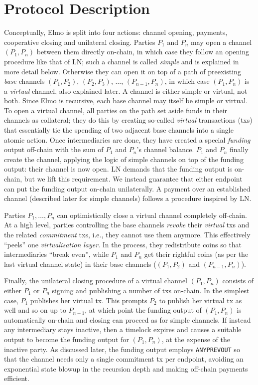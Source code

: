 \section{Protocol Description}
  Conceptually, Elmo is split into four actions: channel opening,
  payments, cooperative closing and unilateral closing. Parties $P_1$ and $P_n$
  may open a channel $(P_1, P_n)$ between them directly on-chain, in which case
  they follow an opening procedure like that of LN; such a channel is called
  \emph{simple} and is explained in more detail below.
  Otherwise they can open it on top of a path
  of preexisting \emph{base} channels $(P_1, P_2)$, $(P_2, P_3)$, $\dots$,
  $(P_{n-1}, P_{n})$, in which case $(P_1, P_n)$ is a \emph{virtual}
  channel, also explained later. A channel is either simple or virtual, not both. Since Elmo is
  recursive, each base channel may itself be simple or
  virtual. To open a virtual
  channel, all parties on the
  path set aside funds in their channels as
  collateral; they do this
  by creating so-called \emph{virtual} transactions (txs) that essentially
  tie the spending of two adjacent base channels into a single atomic action.
  Once intermediaries are done, they have created a special \emph{funding}
  output off-chain with the sum of $P_1$ and $P_n$'s channel
  balance. $P_1$ and $P_n$
  finally create the channel, applying the logic of simple channels on top of
  the funding output: their channel is now open. LN demands that the funding
  output is on-chain, but we lift this requirement. We instead guarantee that
  either endpoint can put the funding output on-chain unilaterally.
  A payment over an established channel (described later for simple channels) follows a procedure inspired by
  LN.

  Parties $P_1, \dots, P_n$ can optimistically close a virtual channel
  completely off-chain. At a high
  level, parties controlling the base channels \emph{revoke} their \emph{virtual}
  txs and the related \emph{commitment} txs, i.e., they cannot use them
  anymore. This effectively ``peels'' one \emph{virtualisation layer}.
  In the process, they redistribute coins so that intermediaries ``break even'',
  while $P_1$
  and $P_n$ get their rightful coins (as per the last virtual channel
  state) in their base channels ($(P_1, P_2)$ and $(P_{n-1}, P_n)$).

  Finally, the unilateral closing procedure of a virtual channel $(P_1, P_n)$
  consists of either $P_1$ or $P_n$ signing and publishing a number of
  txs on-chain. In the simplest case, $P_1$ publishes her virtual tx. This
  prompts $P_2$ to publish her
  virtual tx as well and so on up to $P_{n-1}$, at which point the
  funding output of $(P_1, P_n)$ is automatically on-chain and closing can
  proceed as for simple channels. If instead any intermediary stays inactive, then a timelock
  expires and causes a suitable output to become the funding output for $(P_1,
  P_n)$, at
  the expense of the inactive party. As discussed later, the funding output
  employs \texttt{ANYPREVOUT} so that the channel needs only a
  single commitment tx per endpoint, avoiding an exponential state blowup in the
  recursion depth and making off-chain payments efficient.

